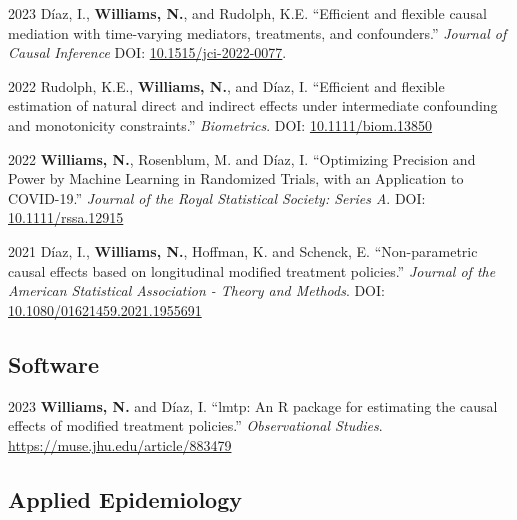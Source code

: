 \documentclass[12pt,letterpaper]{report}
\begin{document}
    \begin{tablist}
    
        \item[2023] \tab Díaz, I., \textbf{Williams, N.}, and Rudolph, K.E. \enquote{Efficient and flexible causal mediation with time-varying mediators, treatments, and confounders.} \textit{Journal of Causal Inference} DOI: \href{https://doi.org/10.1515/jci-2022-0077}{10.1515/jci-2022-0077}.
    
    	\item[2022] \tab Rudolph, K.E., \textbf{Williams, N.}, and Díaz, I. \enquote{Efficient and flexible estimation of natural direct and indirect effects under intermediate confounding and monotonicity constraints.} \textit{Biometrics}. DOI: \href{https://doi.org/10.1111/biom.13850}{10.1111/biom.13850}
    
        \item[2022] \tab \textbf{Williams, N.}, Rosenblum, M. and Díaz, I. \enquote {Optimizing Precision and Power by Machine Learning in Randomized Trials, with an Application to COVID-19.} \textit {Journal of the Royal Statistical Society: Series A}. DOI: \href{https://doi.org/10.1111/rssa.12915}{10.1111/rssa.12915}
    
       \item[2021] \tab Díaz, I., \textbf{Williams, N.}, Hoffman, K. and Schenck, E. \enquote{Non-parametric causal effects based on longitudinal modified treatment policies.} \textit{Journal of the American Statistical Association - Theory and Methods}. DOI: \href{https://doi.org/10.1080/01621459.2021.1955691}{10.1080/01621459.2021.1955691}
       
    \end{tablist}
    
    \subsection*{Software}
    
    \begin{tablist}
    
        \item[2023] \tab \textbf{Williams, N.} and Díaz, I. \enquote{lmtp: An R package for estimating the causal effects of modified treatment policies.} \textit{Observational Studies}. \url{https://muse.jhu.edu/article/883479}
    
    \end{tablist}

    \subsection*{Applied Epidemiology}
\end{document}
